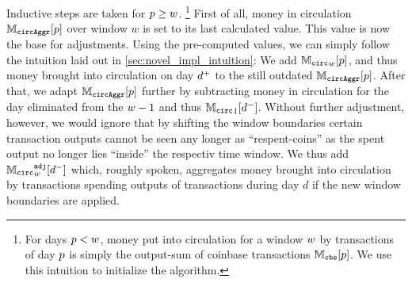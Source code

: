 Inductive steps are taken for \({p} \geq {w} \).%
\footnote{
For days \({p} < {w} \), money put into circulation for a window \({w}\) by transactions of day \({p}\) is simply the output-sum of coinbase transactions \({\mathbb{M}_{{\mathtt{cbs}}}}[{p}]\). %
We use this intuition to initialize the algorithm.} %
First of all, money in circulation \({\mathbb{M}_{\mathtt{circAggr}}}[{p}]\) over window \(w\) is set to its last calculated value. %
This value is now the base for adjustments. %
Using the pre-computed values, we can simply follow the intuition laid out in \ref{sec:novel_impl_intuition}: %
We add \({{\mathbb{M}_{\mathtt{circ}}}_{{w}}}[{p}]\), and thus money brought into circulation on day \({d^{+}}\) to the still outdated \({\mathbb{M}_{\mathtt{circAggr}}}[{p}]\). %
After that, we adapt \({\mathbb{M}_{\mathtt{circAggr}}}[{p}]\) further by subtracting money in circulation for the day eliminated from the \({w} - 1\) and thus \({\mathbb{M}_{\mathtt{circ}}}_{1}[{d^{-}}]\). %
Without further adjustment, however, we would ignore that by shifting the window boundaries certain transaction outputs cannot be seen any longer as ``respent-coins'' as the spent output no longer lies ``inside'' the respectiv time window. %
We thus add \( {{\mathbb{M}_{\mathtt{circ}}}^{\mathtt{adj}}_{{w}}}[{d^{-}}] \) which, roughly spoken, aggregates money brought into circulation by transactions spending outputs of transactions during day \(d\) if the new window boundaries are applied. %




